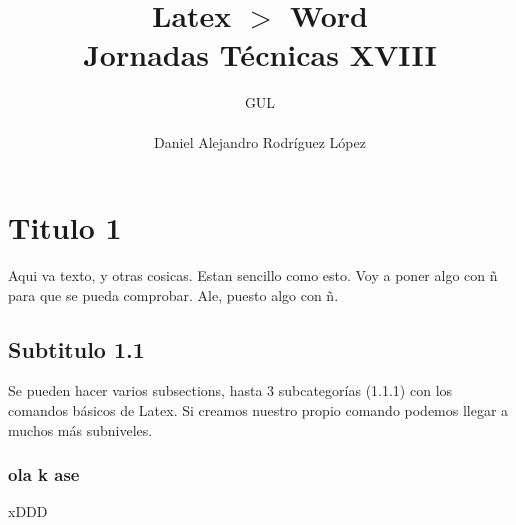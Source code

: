 \documentclass[10pt,a4paper,titlepage]{article} %
\title{ \textbf{ \Huge{Latex $>$ Word}} \\ Jornadas Técnicas XVIII}
\author{
		\begin{tabular}{l}
			\multicolumn{1}{l}{GUL} \\ \hline \\
			Daniel Alejandro Rodríguez López \\
		\end{tabular}
}
\begin{document}
\maketitle
\newpage

\tableofcontents
\newpage

	\section{Titulo 1}
	Aqui va texto, y otras cosicas. Estan sencillo como esto. Voy a poner algo con ñ para que se pueda comprobar. Ale, puesto algo con ñ.

	\subsection{Subtitulo 1.1}
		Se pueden hacer varios subsections, hasta 3 subcategorías (1.1.1) con los comandos básicos de Latex. Si creamos nuestro propio comando podemos llegar a muchos más subniveles. 
		\subsubsection{ola k ase}
			xDDD
\end{document}

